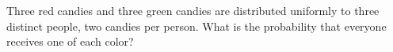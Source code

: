 Three red candies and three green candies are distributed uniformly to three distinct people, two candies per person. What is the probability that everyone receives one of each color?
